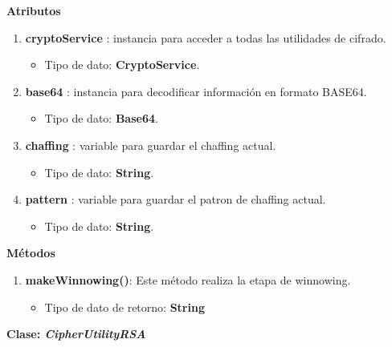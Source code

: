 \documentclass[12pt, a4paper, titlepage]{report}
\begin{document}
                    \textbf{Atributos}
                    \begin{enumerate}
    		            \item \textbf{cryptoService} : instancia para acceder a todas las utilidades de cifrado.
        		        \begin{itemize}
        		            \item Tipo de dato: \textbf{CryptoService}.
        		        \end{itemize}
        		        \item \textbf{base64} : instancia para decodificar información en formato BASE64.
        		        \begin{itemize}
        		            \item Tipo de dato: \textbf{Base64}.
        		        \end{itemize}
        		        \item \textbf{chaffing} : variable para guardar el chaffing actual.
        		        \begin{itemize}
        		            \item Tipo de dato: \textbf{String}.
        		        \end{itemize}
        		        \item \textbf{pattern} : variable para guardar el patron de chaffing actual.
        		        \begin{itemize}
        		            \item Tipo de dato: \textbf{String}.
        		        \end{itemize}
                    \end{enumerate}
                    
		            \textbf{Métodos}
    		        \begin{enumerate}
    		            \item \textbf{makeWinnowing()}: Este método realiza la etapa de winnowing.
    		            \begin{itemize}
    		                \item Tipo de dato de retorno: \textbf{String}
    		            \end{itemize}
    		        \end{enumerate} 
    		        
    		        
    		    
    		    \textbf{\textcolor{guindapoli}{Clase: \textit{CipherUtilityRSA}}}\\
                    
\end{document}
